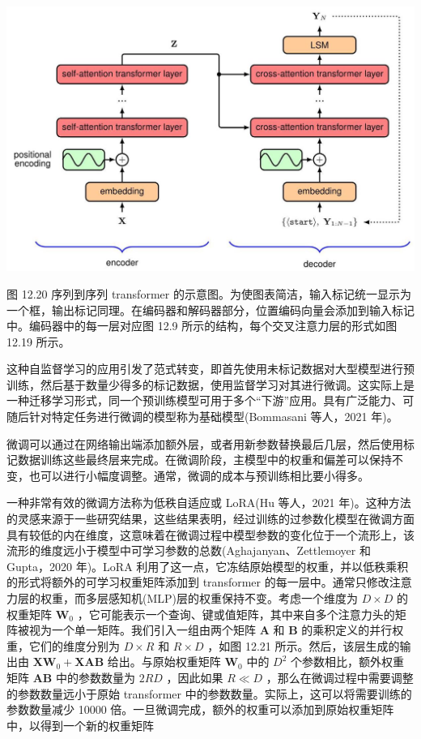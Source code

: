 \documentclass[10pt]{article}
\begin{document}
\begin{center}
\includegraphics[max width=1.0\textwidth]{images/0194e279-9b28-703a-88f4-c3ac21e2010d_411_297_354_1245_807_0.jpg}
\end{center}
\hspace*{3em} 

图 12.20 序列到序列 transformer 的示意图。为使图表简洁，输入标记统一显示为一个框，输出标记同理。在编码器和解码器部分，位置编码向量会添加到输入标记中。编码器中的每一层对应图 12.9 所示的结构，每个交叉注意力层的形式如图 12.19 所示。

这种自监督学习的应用引发了范式转变，即首先使用未标记数据对大型模型进行预训练，然后基于数量少得多的标记数据，使用监督学习对其进行微调。这实际上是一种迁移学习形式，同一个预训练模型可用于多个“下游”应用。具有广泛能力、可随后针对特定任务进行微调的模型称为基础模型(Bommasani 等人，2021 年)。

微调可以通过在网络输出端添加额外层，或者用新参数替换最后几层，然后使用标记数据训练这些最终层来完成。在微调阶段，主模型中的权重和偏差可以保持不变，也可以进行小幅度调整。通常，微调的成本与预训练相比要小得多。

一种非常有效的微调方法称为低秩自适应或 LoRA(Hu 等人，2021 年)。这种方法的灵感来源于一些研究结果，这些结果表明，经过训练的过参数化模型在微调方面具有较低的内在维度，这意味着在微调过程中模型参数的变化位于一个流形上，该流形的维度远小于模型中可学习参数的总数(Aghajanyan、Zettlemoyer 和 Gupta，2020 年)。LoRA 利用了这一点，它冻结原始模型的权重，并以低秩乘积的形式将额外的可学习权重矩阵添加到 transformer 的每一层中。通常只修改注意力层的权重，而多层感知机(MLP)层的权重保持不变。考虑一个维度为 \(D \times  D\) 的权重矩阵 \({\mathbf{W}}_{0}\) ，它可能表示一个查询、键或值矩阵，其中来自多个注意力头的矩阵被视为一个单一矩阵。我们引入一组由两个矩阵 \(\mathbf{A}\) 和 \(\mathbf{B}\) 的乘积定义的并行权重，它们的维度分别为 \(D \times  R\) 和 \(R \times  D\) ，如图 12.21 所示。然后，该层生成的输出由 \({\mathbf{{XW}}}_{0} + \mathbf{{XAB}}\) 给出。与原始权重矩阵 \({\mathbf{W}}_{0}\) 中的 \({D}^{2}\) 个参数相比，额外权重矩阵 \(\mathbf{{AB}}\) 中的参数数量为 \({2RD}\) ，因此如果 \(R \ll  D\) ，那么在微调过程中需要调整的参数数量远小于原始 transformer 中的参数数量。实际上，这可以将需要训练的参数数量减少 10000 倍。一旦微调完成，额外的权重可以添加到原始权重矩阵中，以得到一个新的权重矩阵
\end{document}
